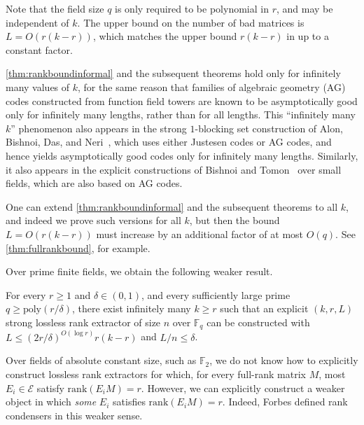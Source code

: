 \documentclass[11pt]{article}
\newcommand{\rank}{\mathrm{rank}}
\newcommand{\F}{\mathbb{F}}
\newcommand{\poly}{\mathrm{poly}}
\begin{document}
Note that the field size $q$ is only required to be polynomial in $r$, and may be independent of $k$. The upper bound on the number of bad matrices is $L=O(r(k-r))$, which matches the upper bound $r(k-r)$ in \cite{FSS14,For14} up to a constant factor. 

\begin{remark}
\cref{thm:rankboundinformal} and the subsequent theorems hold only for infinitely many values of $k$, for the same reason that families of algebraic geometry (AG) codes constructed from function field towers are known to be asymptotically good only for infinitely many lengths, rather than for all lengths. This “infinitely many $k$” phenomenon also appears in the strong $1$-blocking set construction of Alon, Bishnoi, Das, and Neri~\cite{ABDN24}, which uses either Justesen codes or AG codes, and hence yields asymptotically good codes only for infinitely many lengths. Similarly, it also appears in the explicit constructions of Bishnoi and Tomon~\cite{BT24} over small fields, which are also based on AG codes.

One can extend \cref{thm:rankboundinformal} and the subsequent theorems to all $k$, and indeed we prove such versions for all $k$, but then the bound $L=O(r(k-r))$ must increase by an additional factor of at most $O(q)$. See \cref{thm:fullrankbound}, for example.
\end{remark}

Over prime finite fields, we obtain the following weaker result.

\begin{theorem}\label{thm:rankprime-informal}
For every $r\ge 1$ and $\delta\in (0,1)$, and every sufficiently large prime $q\ge \poly(r/\delta)$, there exist infinitely many $k\ge r$ such that an explicit $(k,r,L)$ strong lossless rank extractor of size $n$ over $\F_q$ can be constructed with
$L\le (2r/\delta)^{O(\log r)} r(k-r)$ and
$L/n\le \delta$.
\end{theorem}

Over fields of absolute constant size, such as $\F_2$, we do not know how to explicitly construct lossless rank extractors for which, for every full-rank matrix $M$, most $E_i\in\mathcal{E}$ satisfy $\rank(E_i M)=r$. However, we can explicitly construct a weaker object in which \emph{some} $E_i$ satisfies $\rank(E_i M)=r$. Indeed, Forbes \cite{For14} defined rank condensers in this weaker sense.
\end{document}
